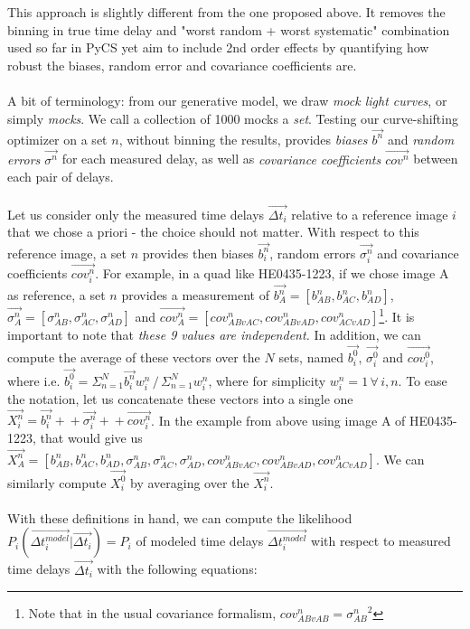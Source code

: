 \documentclass[11pt]{scrartcl}
\renewcommand{\vec}{\overrightarrow}  %
\begin{document}
This approach is slightly different from the one proposed above. It 
removes the binning in true time delay and "worst random + worst 
systematic" combination used so far in PyCS yet aim to include 2nd order 
effects by quantifying how robust the biases, random error and 
covariance coefficients are.\\
\\
A bit of terminology: from our generative model, we draw \emph{mock 
light curves}, or simply \emph{mocks}. We call a collection of 1000 
mocks a \emph{set}. Testing our curve-shifting optimizer on a 
set $n$, without binning the results, provides \emph{biases 
$\vec{b^n}$} and \emph{random errors $\vec{\sigma^n}$} for each 
measured delay, as well as \emph{covariance coefficients $\vec{cov^n}$} 
between each pair of delays.\\
\\
Let us consider only the measured time delays $\vec{\Delta t_{i}}$ 
relative to a reference image $i$ that we chose a priori - the choice 
should not matter. With respect to this reference image, a set $n$ 
provides then biases $\vec{b^n_i}$, random errors $\vec{\sigma^n_i}$ 
and covariance coefficients $\vec{cov^n_i}$. For example, in a quad 
like HE0435-1223, if we chose image A as reference, a set $n$ 
provides a measurement of $\vec{b^n_A} = [b^n_{AB}, b^n_{AC}, 
b^n_{AD}]$, 
$\vec{\sigma^n_A} = [\sigma^n_{AB}, \sigma^n_{AC}, \sigma^n_{AD}]$ and 
$\vec{cov^n_A} = [cov^n_{ABvAC}, cov^n_{ABvAD}, 
cov^n_{ACvAD}]$\footnote{Note that in the usual covariance formalism, 
$cov^n_{ABvAB} = {\sigma^n_{AB}}^2$}.  It is 
important to note that \emph{these 9 values are independent.} In 
addition, we can compute the average of these vectors over the $N$ 
sets, named $\vec{b^0_i}$, $\vec{\sigma^0_i}$ and $\vec{cov^0_i}$, 
where i.e. $\vec{b^0_i} = \Sigma_{n=1}^N \vec{b^n_i}w_i^n \, / \, 
\Sigma_{n=1}^Nw_i^n$, where for simplicity $w_i^n=1 \,\forall\, i,n$. 
To ease the notation, let us concatenate these vectors into a single 
one $\vec{X^n_i} = 
\vec{b^n_i}+\!\!+\vec{\sigma^n_i}+\!\!+\vec{cov^n_i}$. In the example 
from above using image A of HE0435-1223, that would give us 
$\vec{X^n_A} = [b^n_{AB}, b^n_{AC}, b^n_{AD}, \sigma^n_{AB}, 
\sigma^n_{AC}, \sigma^n_{AD}, cov^n_{ABvAC}, cov^n_{ABvAD}, 
cov^n_{ACvAD}]$. We can similarly compute $\vec{X^0_i}$ by averaging 
over the $\vec{X^n_i}$.\\
\\
With these definitions in hand, we can compute the likelihood 
$P_i(\vec{\Delta t_{i}^{model}}|\vec{\Delta t_{i}}) = P_i$ of modeled 
time delays $\vec{\Delta t_{i}^{model}}$ with respect to measured time 
delays $\vec{\Delta t_{i}}$ with the following equations:
\end{document}
